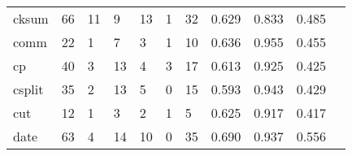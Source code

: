 \begin{longtable}{lp{1.20cm}p{1.20cm}p{1.20cm}p{1.20cm}p{1.20cm}p{1.20cm}p{1.20cm}p{1.20cm}p{1.20cm}p{1.20cm}}
cksum     &                                    66 &                                                 11 &                                                  9 &                                                 13 &                                                  1 &                                                 32 &                                         0.629 &                                              0.833 &                                              0.485 \\
comm      &                                    22 &                                                  1 &                                                  7 &                                                  3 &                                                  1 &                                                 10 &                                         0.636 &                                              0.955 &                                              0.455 \\
cp        &                                    40 &                                                  3 &                                                 13 &                                                  4 &                                                  3 &                                                 17 &                                         0.613 &                                              0.925 &                                              0.425 \\
csplit    &                                    35 &                                                  2 &                                                 13 &                                                  5 &                                                  0 &                                                 15 &                                         0.593 &                                              0.943 &                                              0.429 \\
cut       &                                    12 &                                                  1 &                                                  3 &                                                  2 &                                                  1 &                                                  5 &                                         0.625 &                                              0.917 &                                              0.417 \\
date      &                                    63 &                                                  4 &                                                 14 &                                                 10 &                                                  0 &                                                 35 &                                         0.690 &                                              0.937 &                                              0.556 \\

\end{longtable}
